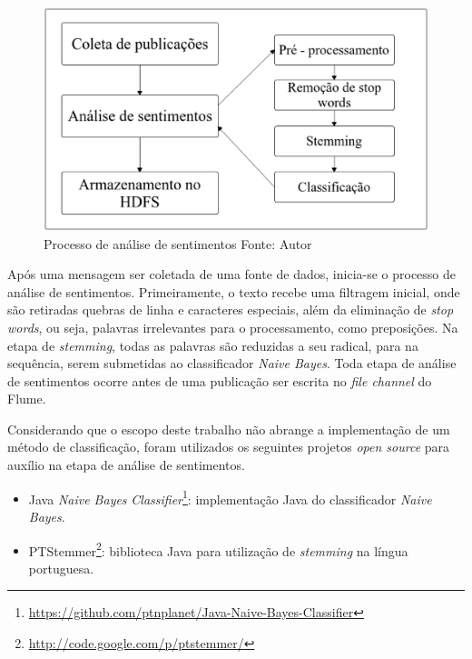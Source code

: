 \begin{figure}[ht!]
	\centering
	\includegraphics[keepaspectratio=true,scale=0.4]
	  {figuras/as.eps}
	\caption[Processo de análise de sentimentos]{Processo de análise de sentimentos
	\protect\linebreak Fonte: Autor}
	\label{senti-analysis}
\end{figure}
\FloatBarrier

Após uma mensagem ser coletada de uma fonte de dados, inicia-se o processo de análise de sentimentos. Primeiramente, o texto recebe uma filtragem inicial, onde são retiradas quebras de linha e caracteres especiais, além da eliminação de \textit{stop words}, ou seja, palavras irrelevantes para o processamento, como preposições. Na etapa de \textit{stemming}, todas as palavras são reduzidas a seu radical, para na sequência, serem submetidas ao classificador \textit{Naive Bayes}. Toda etapa de análise de sentimentos ocorre antes de uma publicação ser escrita no \textit{file channel} do Flume.

Considerando que o escopo deste trabalho não abrange a implementação de um método de classificação, foram utilizados os seguintes projetos \textit{open source} para auxílio na etapa de análise de sentimentos.

\begin{itemize}

  \item Java \textit{Naive Bayes} \textit{Classifier}\footnote{\url{https://github.com/ptnplanet/Java-Naive-Bayes-Classifier}}: implementação Java do classificador \textit{Naive Bayes}.
  \item PTStemmer\footnote{\url{http://code.google.com/p/ptstemmer/}}: biblioteca Java para utilização de \textit{stemming} na língua portuguesa.

\end{itemize}


